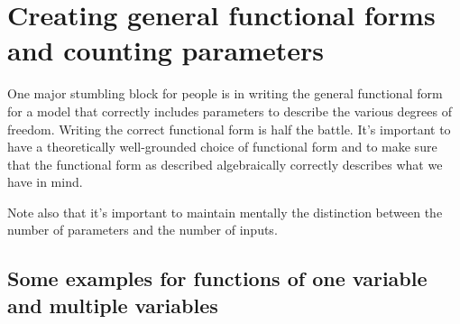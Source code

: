 \documentclass[10pt]{amsart}
\begin{document}
\section{Creating general functional forms and counting parameters}

One major stumbling block for people is in writing the general
functional form for a model that correctly includes parameters to
describe the various degrees of freedom. Writing the correct
functional form is half the battle. It's important to have a
theoretically well-grounded choice of functional form and to make sure
that the functional form as described algebraically correctly
describes what we have in mind.

Note also that it's important to maintain mentally the distinction
between the number of parameters and the number of inputs.

\subsection{Some examples for functions of one variable and multiple variables}
\end{document}
